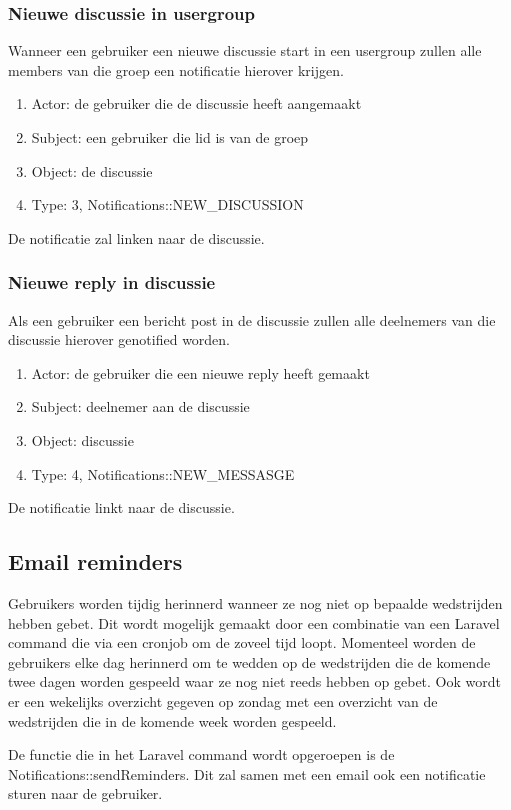 \documentclass[11pt, a4paper]{article}
\begin{document}
\subsubsection{Nieuwe discussie in usergroup}
Wanneer een gebruiker een nieuwe discussie start in een usergroup zullen alle members van die groep een notificatie hierover krijgen.
\begin{enumerate}
\item Actor: de gebruiker die de discussie heeft aangemaakt
\item Subject: een gebruiker die lid is van de groep
\item Object: de discussie
\item Type: 3, Notifications::NEW_DISCUSSION
\end{enumerate}
De notificatie zal linken naar de discussie.

\subsubsection{Nieuwe reply in discussie}
Als een gebruiker een bericht post in de discussie zullen alle deelnemers van die discussie hierover genotified worden.
\begin{enumerate}
\item Actor: de gebruiker die een nieuwe reply heeft gemaakt
\item Subject: deelnemer aan de discussie
\item Object: discussie
\item Type: 4, Notifications::NEW_MESSASGE
\end{enumerate}
De notificatie linkt naar de discussie.

\subsection{Email reminders}
Gebruikers worden tijdig herinnerd wanneer ze nog niet op bepaalde wedstrijden hebben gebet. Dit wordt mogelijk gemaakt door een combinatie van een Laravel command die via een cronjob om de zoveel tijd loopt.
Momenteel worden de gebruikers elke dag herinnerd om te wedden op de wedstrijden die de komende twee dagen worden gespeeld waar ze nog niet reeds hebben op gebet.
Ook wordt er een wekelijks overzicht gegeven op zondag met een overzicht van de wedstrijden die in de komende week worden gespeeld.

De functie die in het Laravel command wordt opgeroepen is de Notifications::sendReminders. Dit zal samen met een email ook een notificatie sturen naar de gebruiker.
\end{document}
